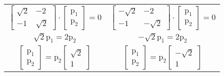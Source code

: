 \documentclass[10pt]{article}
\begin{document}
{{\begin{spacing}{1.5}
\begin{center}
\begin{tabular}{@{}c c@{}}
        $
        \begin{bmatrix}
            \sqrt2&-2\\
            -1&\sqrt2
        \end{bmatrix}
        \cdot
        \begin{bmatrix}
            {\text{p}}_1\\
            {\text{p}}_2
        \end{bmatrix}
        = 0
        $
        \;\;\;\;\;\;\;\;\;\;\;&\;\;\;\;\;\;\;\;\;\;\;\;\;\;\;\;\;\;\;\;\;\;\;\;\;\;\;\;\;
        $
        \begin{bmatrix}
            -\sqrt2&-2\\
            -1&-\sqrt2
        \end{bmatrix}
        \cdot
        \begin{bmatrix}
            {\text{p}}_1\\
            {\text{p}}_2
        \end{bmatrix}
        = 0
        $\\[5pt]

        $\sqrt2{\text{p}}_1=2{\text{p}}_2 $
        \;\;\;\;\;\;\;\;\;\;\;\;\;\;\;\;\;\;\;\;\;\;\;\;\;&\;\;\;\;\;\;\;\;\;\;\;
        $-\sqrt2{\text{p}}_1=2{\text{p}}_2 $\\[1pt]

        $
        \begin{bmatrix}
            {\text{p}}_1\\
            {\text{p}}_2
        \end{bmatrix}
        =
        {\text{p}}_2
        \begin{bmatrix}
            \sqrt2\\
            1
        \end{bmatrix}
        $
        \;\;\;\;\;\;\;\;\;\;\;\;\;\;\;\;\;&\;\;\;\;\;\;\;\;\;\;\;\;\;\;\;\;\;\;\;\;\;\;\;\;\;
        $
        \begin{bmatrix}
            {\text{p}}_1\\
            {\text{p}}_2
        \end{bmatrix}
        =
        {\text{p}}_2
        \begin{bmatrix}
            -\sqrt2\\
            1
        \end{bmatrix}
        $\\[16pt]


\end{tabular}
\end{center}
\end{spacing}}}
\end{document}
